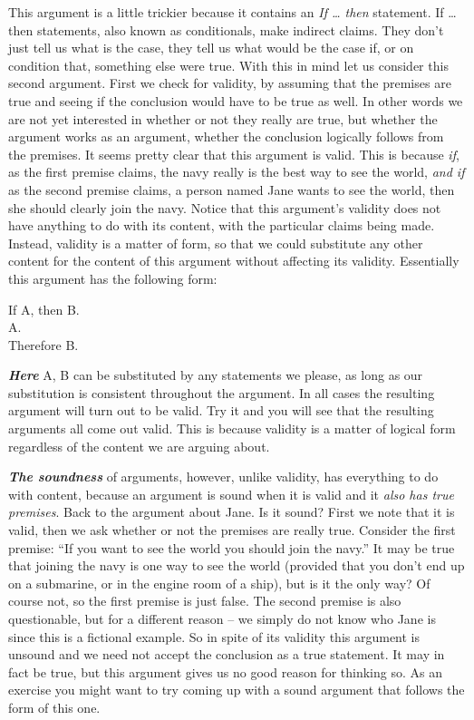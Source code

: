 \documentclass[
  12pt, openany]{book}
\theoremstyle{definition}
\theoremstyle{definition}
\theoremstyle{definition}
\theoremstyle{definition}
\theoremstyle{remark}
\begin{document}
This argument is a little trickier because it contains an \emph{If \ldots{} then} statement. If \ldots{} then statements, also known as conditionals, make indirect claims. They don't just tell us what is the case, they tell us what would be the case if, or on condition that, something else were true. With this in mind let us consider this second argument. First we check for validity, by assuming that the premises are true and seeing if the conclusion would have to be true as well. In other words we are not yet interested in whether or not they really are true, but whether the argument works as an argument, whether the conclusion logically follows from the premises. It seems pretty clear that this argument is valid. This is because \emph{if}, as the first premise claims, the navy really is the best way to see the world, \emph{and if} as the second premise claims, a person named Jane wants to see the world, then she should clearly join the navy. Notice that this argument's validity does not have anything to do with its content, with the particular claims being made. Instead, validity is a matter of form, so that we could substitute any other content for the content of this argument without affecting its validity. Essentially this argument has the following form:

\begin{center}

\begin{argument}
If A, then B.\\
A.\\

Therefore B.

\end{argument}


\end{center}

\textbf{\emph{Here}} A, B can be substituted by any statements we please, as long as our substitution is consistent throughout the argument. In all cases the resulting argument will turn out to be valid. Try it and you will see that the resulting arguments all come out valid. This is because validity is a matter of logical form regardless of the content we are arguing about.

\textbf{\emph{The soundness}} of arguments, however, unlike validity, has everything to do with content, because an argument is sound when it is valid and it \emph{also has true premises}. Back to the argument about Jane. Is it sound? First we note that it is valid, then we ask whether or not the premises are really true. Consider the first premise: ``If you want to see the world you should join the navy.'' It may be true that joining the navy is one way to see the world (provided that you don't end up on a submarine, or in the engine room of a ship), but is it the only way? Of course not, so the first premise is just false. The second premise is also questionable, but for a different reason -- we simply do not know who Jane is since this is a fictional example. So in spite of its validity this argument is unsound and we need not accept the conclusion as a true statement. It may in fact be true, but this argument gives us no good reason for thinking so. As an exercise you might want to try coming up with a sound argument that follows the form of this one.
\end{document}
